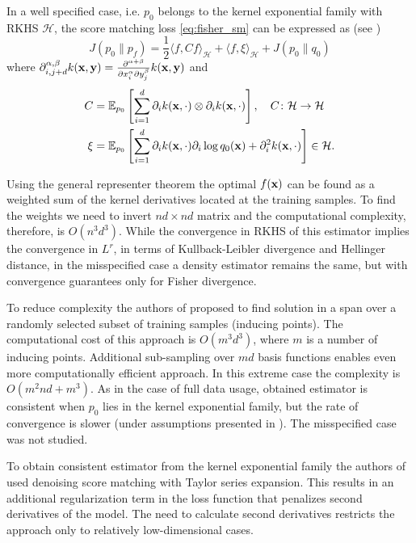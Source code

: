 In a well specified case, i.e. $p_0$ belongs to the kernel exponential family with RKHS
$\mathcal{H}$, the score matching loss \eqref{eq:fisher_sm}
can be expressed as (see \cite{Gretton2013})
\begin{equation}
    \label{eq:sm_kernel}
    J(p_0 \| p_f) =
    \frac{1}{2} \langle f, Cf\rangle_{\mathcal{H}} + \langle f, \xi\rangle_{\mathcal{H}} + J(p_0 \| q_0)
\end{equation}
where
$\partial^{\alpha,\beta}_{i, j + d} k({\bf x, \bf y}) =
\frac{\partial^{\alpha + \beta}}{\partial x_i^{\alpha}\partial y_j^{\beta}}k({\bf x, \bf y})$
and
\begin{align*}
    C &= \mathbb{E}_{p_0} \left[
        \sum_{i = 1}^d \partial_i k ({\bf  x}, \cdot) \otimes \partial_i k ({\bf  x}, \cdot)
    \right], \quad C \colon \mathcal{H} \to \mathcal{H} \\
    \xi &= \mathbb{E}_{p_0} \left[
        \sum_{i = 1}^d \partial_i k ({\bf  x}, \cdot)\partial_i \log q_0({\bf x}) +
        \partial^2_i k ({\bf  x}, \cdot)
        \right] \in \mathcal{H}.
\end{align*}

Using the general representer theorem the optimal $f({\bf x})$ can be found
as a weighted sum of the kernel derivatives located at the training samples.
To find the weights we need to invert $nd \times nd$ matrix and the computational
complexity, therefore, is $O(n^3d^3)$.
While the convergence in RKHS of this estimator implies the convergence in $L^r$,
in terms of Kullback-Leibler divergence and Hellinger distance,
in the misspecified case a density estimator remains the same,
but with convergence guarantees only for Fisher divergence.

To reduce complexity the authors of \cite{sutherland2017efficient} proposed to
find solution in a span over a randomly selected subset of training samples (inducing points).
The computational cost of this approach is $O(m^3d^3)$,
where $m$ is a number of inducing points.
Additional sub-sampling over $md$ basis functions enables even more computationally efficient
approach.
In this extreme case the complexity is $O(m^2nd + m^3)$.
As in the case of full data usage, obtained estimator is consistent when $p_0$
lies in the kernel exponential family,
but the rate of convergence is slower (under assumptions presented in \cite{sutherland2017efficient}).
The misspecified case was not studied.

To obtain consistent estimator from the kernel exponential family
the authors of \cite{GrettonDeep} used denoising score matching with Taylor series expansion.
This results in an additional regularization term in the loss function
that penalizes second derivatives of the model.
The need to calculate second derivatives restricts the approach only to
relatively low-dimensional cases.

